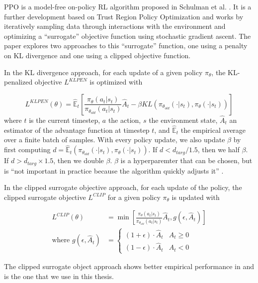 PPO is a model-free on-policy RL algorithm proposed in Schulman et al. \cite{schulman2017proximal}.
It is a further development based on Trust Region Policy Optimization \cite{schulman2017trust} and works by iteratively sampling data through interactions with the environment and optimizing a ``surrogate'' objective function using stochastic gradient ascent. The paper explores two approaches to this ``surrogate'' function, one using a penalty on KL divergence and one using a clipped objective function.

In the KL divergence approach, for each update of a given policy $\pi_\theta$, the KL-penalized objective $L^{KLPEN}$ is optimized with

\begin{equation}
	L^{KLPEN}(\theta) = \hat{\mathbb{E}}_t \left[\frac{\pi_\theta(a_t | s_t)}{\pi_{\theta_{old}} (a_t | s_t)} \hat{A}_t - \beta KL \left( \pi_{\theta_{old}} (\cdot | s_t), \pi_\theta(\cdot | s_t)\right) \right]
\end{equation}
where $t$ is the current timestep, $a$ the action, $s$ the environment state, $\hat{A}_t$ an estimator of the advantage function at timestep $t$, and $\hat{\mathbb{E}}_t$ the empirical average over a finite batch of samples.
With every policy update, we also update $\beta$ by first computing $d = \hat{\mathbb{E}}_t\left(\pi_{\theta_{old}} (\cdot | s_t), \pi_{\theta}(\cdot | s_t)\right)$.
If $d < d_{targ} / 1.5$, then we half $\beta$.
If $d > d_{targ} \times 1.5$, then we double $\beta$. $\beta$ is a hyperparemter that can be chosen, but is ``not important in practice because the algorithm quickly adjusts it'' \cite{schulman2017proximal}.

In the clipped surrogate objective approach, for each update of the policy, the clipped surrogate objective $L^{CLIP}$ for a given policy $\pi_\theta$ is updated with

\begin{align}
	L^{CLIP}(\theta) &= \min \left[ 
		\frac{\pi_\theta(a_t | s_t)}{\pi_{\theta_{old}} (a_t | s_t)} \hat{A}_t, g(\epsilon, \hat{A}_t)
	\right]\\
	\text{where } g(\epsilon, \hat{A}_t) &= \begin{cases}
		(1 + \epsilon) \cdot \hat{A}_t & \hat{A}_t \geq 0 \\
		(1 - \epsilon) \cdot \hat{A}_t & \hat{A}_t < 0
	\end{cases}
\end{align}

The clipped surrogate object approach shows better empirical performance in \cite{schulman2017proximal} and is the one that we use in this thesis.

